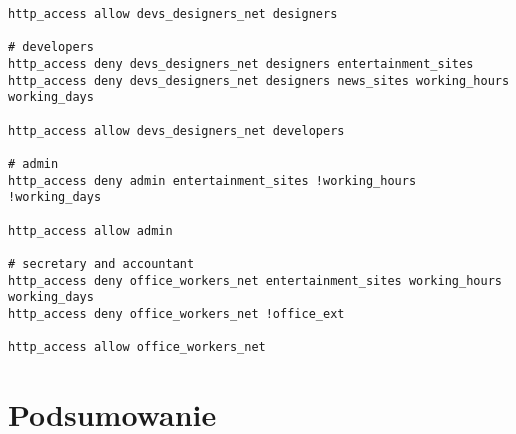\documentclass{article}
\begin{document}
\begin{lstlisting}[caption=Zmiany w pliku squid.conf \label{lst:squid-conf}]
http_access allow devs_designers_net designers

# developers
http_access deny devs_designers_net designers entertainment_sites
http_access deny devs_designers_net designers news_sites working_hours working_days

http_access allow devs_designers_net developers

# admin
http_access deny admin entertainment_sites !working_hours !working_days

http_access allow admin

# secretary and accountant
http_access deny office_workers_net entertainment_sites working_hours working_days
http_access deny office_workers_net !office_ext

http_access allow office_workers_net
\end{lstlisting}

\section{Podsumowanie}
\end{document}
